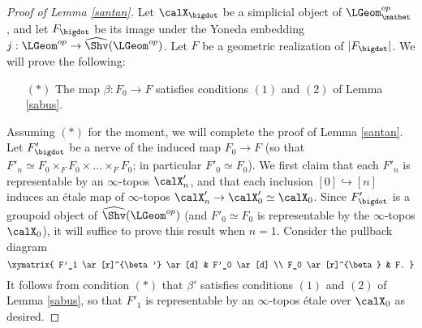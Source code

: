 \begin{proof}[Proof of Lemma \ref{santan}]
Let $\calX_{\bigdot}$ be a simplicial object of $\LGeom^{op}_{\mathet}$, and let
$F_{\bigdot}$ be its image under the Yoneda embedding 
$j: \LGeom^{op} \rightarrow \widehat{\Shv}( \LGeom^{op} )$. Let $F$ be a geometric realization
of $|F_{\bigdot}|$. We will prove the following:
\begin{itemize}
\item[$(\ast)$] The map $\beta: F_0 \rightarrow F$ satisfies conditions $(1)$ and $(2)$ of Lemma \ref{sabus}.
\end{itemize}
Assuming $(\ast)$ for the moment, we will complete the proof of Lemma \ref{santan}. Let
$F'_{\bigdot}$ be a \Cech nerve of the induced map
$F_0 \rightarrow F$ (so that $F'_{n} \simeq F_0 \times_{F} F_0 \times \ldots \times_{F} F_0$; in particular $F'_0 \simeq F_0$). We first claim that each $F'_{n}$ is representable by an $\infty$-topos $\calX'_{n}$, and that each inclusion $[0] \hookrightarrow [n]$ induces an \'{e}tale map of $\infty$-topos $\calX'_{n} \rightarrow \calX'_0 \simeq \calX_0$. Since $F'_{\bigdot}$ is a groupoid object of $\widehat{\Shv}( \LGeom^{op} )$ (and $F'_0 \simeq F_0$ is representable by the $\infty$-topos $\calX_0$), it will suffice to prove this result when $n=1$. Consider the pullback diagram
$$ \xymatrix{ F'_1 \ar[r]^{\beta'} \ar[d] & F'_0 \ar[d] \\
F_0 \ar[r]^{\beta} & F. }$$
It follows from condition $(\ast)$ that $\beta'$ satisfies conditions $(1)$ and $(2)$ of Lemma \ref{sabus},
so that $F'_1$ is representable by an $\infty$-topos \'{e}tale over $\calX_0$ as desired.


\end{proof}
